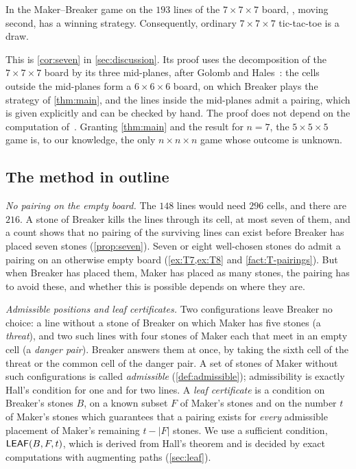 \begin{corollary}\label{cor:seven-intro}
In the Maker--Breaker game on the $193$ lines of the $7\times7\times7$ board, \Breaker, moving second,
has a winning strategy. Consequently, ordinary $7\times7\times7$ tic-tac-toe is a draw.
\end{corollary}

This is \cref{cor:seven} in \cref{sec:discussion}. Its proof uses the decomposition of the
$7\times7\times7$ board by its three mid-planes, after Golomb and Hales~\cite{GolombHales2002}: the
cells outside the mid-planes form a $6\times6\times6$ board, on which Breaker plays the strategy of
\cref{thm:main}, and the lines inside the mid-planes admit a pairing, which is given explicitly and can
be checked by hand. The proof does not depend on the computation of~\cite{CainRaymondKallersjo2025}.
Granting \cref{thm:main} and the result for $n=7$, the $5\times5\times5$ game is, to our knowledge, the
only $n\times n\times n$ game whose outcome is unknown.

\subsection{The method in outline}\label{ssec:intro-method}

\emph{No pairing on the empty board.} The $148$ lines would need $296$ cells, and there are $216$. A
stone of Breaker kills the lines through its cell, at most seven of them, and a count shows that no
pairing of the surviving lines can exist before Breaker has placed seven stones (\cref{prop:seven}).
Seven or eight well-chosen stones do admit a pairing on an otherwise empty board
(\cref{ex:T7,ex:T8} and \cref{fact:T-pairings}). But when Breaker has placed them, Maker has placed as many stones, the pairing has
to avoid these, and whether this is possible depends on where they are.

\emph{Admissible positions and leaf certificates.} Two configurations leave Breaker no choice: a line
without a stone of Breaker on which Maker has five stones (a \emph{threat}), and two such lines with four
stones of Maker each that meet in an empty cell (a \emph{danger pair}). Breaker answers them at once, by
taking the sixth cell of the threat or the common cell of the danger pair. A set of stones of Maker
without such configurations is called \emph{admissible} (\cref{def:admissible}); admissibility is exactly
Hall's condition for one and for two lines. A \emph{leaf certificate} is a condition on Breaker's
stones $B$, on a known subset $F$ of Maker's stones and on the number $t$ of Maker's stones which
guarantees that a pairing exists for \emph{every} admissible placement of Maker's remaining $t-|F|$
stones. We use a sufficient condition, $\mathsf{LEAF}(B,F,t)$, which is derived from Hall's theorem and is
decided by exact computations with augmenting paths (\cref{sec:leaf}).


